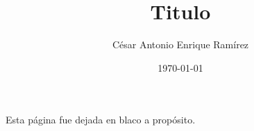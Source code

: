 \documentclass[11pt]{report}
\title{\textbf{Titulo}}
\author{César Antonio Enrique Ramírez}
\date{\today}
\begin{document}
\maketitle
\tableofcontents
\newpage

\thispagestyle{empty}
\null
\vfill
\begin{center}
	Esta página fue dejada en blaco a propósito.
\end{center}
\newpage






\end{document}
